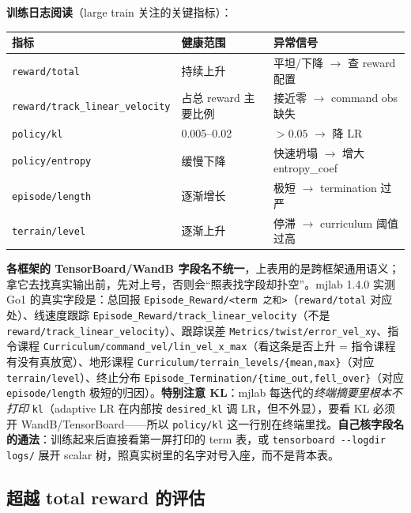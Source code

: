\textbf{训练日志阅读}（large train 关注的关键指标）：

\begin{center}
\small
\begin{tabular}{@{}lll@{}}
\toprule
指标 & 健康范围 & 异常信号 \\
\midrule
\verb|reward/total| & 持续上升 & 平坦/下降 $\to$ 查 reward 配置 \\
\verb|reward/track_linear_velocity| & 占总 reward 主要比例 & 接近零 $\to$ command obs 缺失 \\
\verb|policy/kl| & 0.005--0.02 & $>0.05$ $\to$ 降 LR \\
\verb|policy/entropy| & 缓慢下降 & 快速坍塌 $\to$ 增大 entropy\_coef \\
\verb|episode/length| & 逐渐增长 & 极短 $\to$ termination 过严 \\
\verb|terrain/level| & 逐渐上升 & 停滞 $\to$ curriculum 阈值过高 \\
\bottomrule
\end{tabular}
\end{center}

\begin{note}
\textbf{各框架的 TensorBoard/WandB 字段名不统一}，上表用的是跨框架通用语义；拿它去找真实输出前，先对上号，否则会“照表找字段却扑空”。mjlab 1.4.0 实测 Go1 的真实字段是：总回报 \verb|Episode_Reward/<term 之和>|（\verb|reward/total| 对应处）、线速度跟踪 \verb|Episode_Reward/track_linear_velocity|（不是 \verb|reward/track_linear_velocity|）、跟踪误差 \verb|Metrics/twist/error_vel_xy|、指令课程 \verb|Curriculum/command_vel/lin_vel_x_max|（看这条是否上升 = 指令课程有没有真放宽）、地形课程 \verb|Curriculum/terrain_levels/{mean,max}|（对应 \verb|terrain/level|）、终止分布 \verb|Episode_Termination/{time_out,fell_over}|（对应 \verb|episode/length| 极短的归因）。\textbf{特别注意 KL}：mjlab 每迭代的\emph{终端摘要里根本不打印} \verb|kl|（adaptive LR 在内部按 \verb|desired_kl| 调 LR，但不外显），要看 KL 必须开 WandB/TensorBoard——所以 \verb|policy/kl| 这一行别在终端里找。\textbf{自己核字段名的通法}：训练起来后直接看第一屏打印的 term 表，或 \verb|tensorboard --logdir logs/| 展开 scalar 树，照真实树里的名字对号入座，而不是背本表。
\end{note}

\subsection{超越 total reward 的评估}
\label{sec:rlmc-ql-train-eval}

